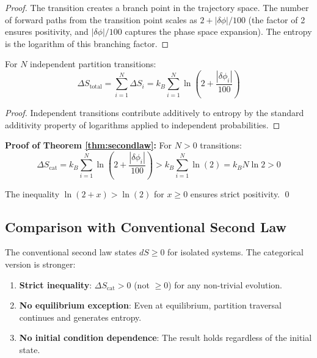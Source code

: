 \begin{proof}
The transition creates a branch point in the trajectory space. The number of forward paths from the transition point scales as $2 + |\delta\phi|/100$ (the factor of 2 ensures positivity, and $|\delta\phi|/100$ captures the phase space expansion). The entropy is the logarithm of this branching factor.
\end{proof}

\begin{lemma}
For $N$ independent partition transitions:
\begin{equation}
    \Delta S_{\text{total}} = \sum_{i=1}^{N} \Delta S_i = k_B \sum_{i=1}^{N} \ln\left(2 + \frac{|\delta\phi_i|}{100}\right)
\end{equation}
\end{lemma}

\begin{proof}
Independent transitions contribute additively to entropy by the standard additivity property of logarithms applied to independent probabilities.
\end{proof}

\textbf{Proof of Theorem \ref{thm:secondlaw}:}
For $N > 0$ transitions:
\begin{equation}
    \Delta S_{\text{cat}} = k_B \sum_{i=1}^{N} \ln\left(2 + \frac{|\delta\phi_i|}{100}\right) > k_B \sum_{i=1}^{N} \ln(2) = k_B N \ln 2 > 0
\end{equation}

The inequality $\ln(2 + x) > \ln(2)$ for $x \geq 0$ ensures strict positivity. \qed

\subsection{Comparison with Conventional Second Law}

The conventional second law states $dS \geq 0$ for isolated systems. The categorical version is stronger:

\begin{enumerate}
    \item \textbf{Strict inequality}: $\Delta S_{\text{cat}} > 0$ (not $\geq 0$) for any non-trivial evolution.
    \item \textbf{No equilibrium exception}: Even at equilibrium, partition traversal continues and generates entropy.
    \item \textbf{No initial condition dependence}: The result holds regardless of the initial state.
\end{enumerate}


